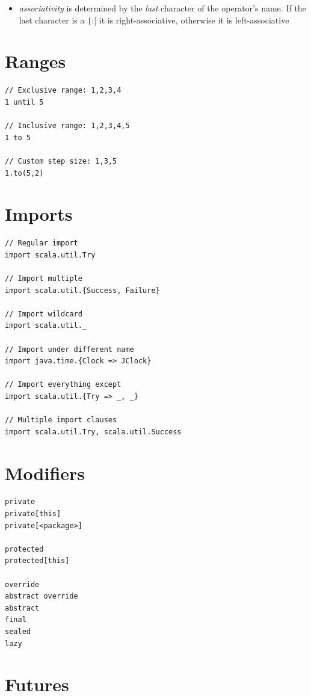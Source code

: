 \documentclass[10pt,landscape,a4paper]{article}
\begin{document}
\begin{multicols*}{4}
\begin{itemize}
\begin{tabular}{l | l}
  \end{tabular}
\item \textit{associativity} is determined by the \textit{last}
  character of the operator's name.  If the last character is a
  \texttt|:| it is right-associative, otherwise it is
  left-associative
\end{itemize}

\section{Ranges}

\begin{verbatim}
// Exclusive range: 1,2,3,4
1 until 5

// Inclusive range: 1,2,3,4,5
1 to 5

// Custom step size: 1,3,5
1.to(5,2)

\end{verbatim}

\section{Imports}

\begin{verbatim}
// Regular import
import scala.util.Try

// Import multiple
import scala.util.{Success, Failure}

// Import wildcard
import scala.util._

// Import under different name
import java.time.{Clock => JClock}

// Import everything except
import scala.util.{Try => _, _}

// Multiple import clauses
import scala.util.Try, scala.util.Success
\end{verbatim}

\section{Modifiers}
\begin{verbatim}
private
private[this]
private[<package>]

protected
protected[this]

override
abstract override
abstract
final
sealed
lazy
\end{verbatim}

\section{Futures}


\end{multicols*}
\end{document}
